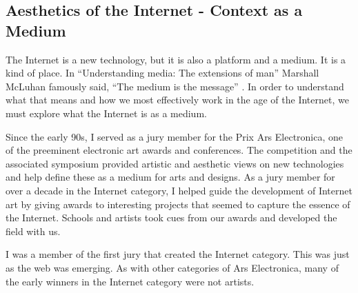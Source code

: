 %
%

\subsection{Aesthetics of the Internet - Context as a Medium}
\label{userrise}

The Internet is a new technology, but it is also a platform and a medium. It is a kind of place. In ``Understanding media: The extensions of man'' Marshall McLuhan famously said, ``The medium is the message'' \cite{mcluhan1994understanding}. In order to understand what that means and how we most effectively work in the age of the Internet, we must explore what the Internet is as a medium.

Since the early 90s, I served as a jury member for the Prix Ars Electronica, one of the preeminent electronic art awards and conferences. The competition and the associated symposium provided artistic and aesthetic views on new technologies and help define these  as a medium for arts and designs. As a jury member for over a decade in the Internet category, I helped guide the development of Internet art by giving awards to interesting projects that seemed to capture the essence of the Internet. Schools and artists took cues from our awards and developed the field with us.

I was a member of the first jury that created the Internet category. This was just as the web was emerging. As with other categories of Ars Electronica, many of the early winners in the Internet category were not artists.

